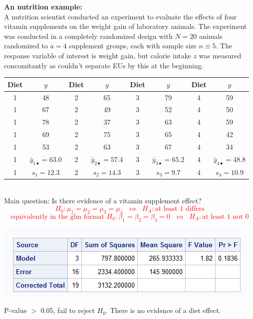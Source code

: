 \textbf{An nutrition example:}\\
A nutrition scientist conducted an experiment to evaluate the effects of four vitamin supplements on the weight gain of laboratory animals.  The experiment was conducted in a completely randomized design with $N=20$ animals randomized to $a=4$ supplement groups, each with sample size $n\equiv 5$.  The response variable of interest is weight gain, but calorie intake $z$ was measured concomitantly as couldn't separate EUs by this at the beginning.  
~\\
\begin{center}
\begin{tabular}{|cc|cc|cc|cc|} \hline
Diet & $y$ & Diet & $y$ &Diet & $y$ &Diet & $y$ \\ \hline
1 & 48 & 2 & 65 & 3 & 79 & 4 & 59 \\
1 & 67 & 2 & 49 & 3 & 52 & 4 & 50 \\
1 & 78 & 2 & 37 & 3 & 63 & 4 & 59 \\
1 & 69 & 2 & 75 & 3 & 65 & 4 & 42 \\
1 & 53 & 2 & 63 & 3 & 67 & 4 & 34 \\ \hline
1 & $\bar{y}_{1\bullet}=63.0$ & 2 & $\bar{y}_{2\bullet}=57.4$  & 3 & $\bar{y}_{3\bullet}=65.2$  & 4 & $\bar{y}_{4\bullet}=48.8$ \\
1 & $s_1=12.3$ & 2 & $s_2=14.3$  & 3 & $s_3=9.7$  & 4 & $s_4=10.9$ \\ \hline
\end{tabular} 
\end{center}
~\\

Main question: Is there evidence of a vitamin supplement effect?
\textcolor{red}{$$H_0:\mu_1=\mu_2=\mu_3=\mu_4~~~~vs~~~~H_A:\mbox{at least 1 differs}$$
$$\mbox{equivalently in the glm format } H_0:\beta_1=\beta_2=\beta_3=0~~~~vs~~~~H_A:\mbox{at least 1 not 0}$$}

\newpage

\begin{center}
\includegraphics{DietsANOVA}
\end{center}
 
P-value $>$ 0.05, fail to reject $H_0$.  There is no evidence of a diet effect.\\~\\~\\

